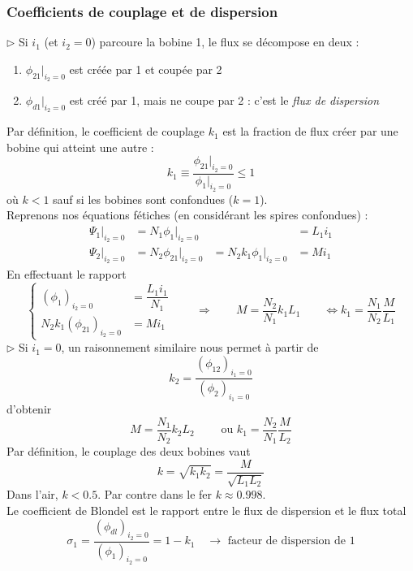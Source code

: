 		\subsubsection{Coefficients de couplage et de dispersion}
		$\triangleright$ Si $i_1$ (et $i_2=0$) parcoure la bobine 1, le flux se décompose en deux :
		\begin{enumerate}
		\item $\phi_{21}|_{i_2=0}$ est créée par 1 et coupée par 2
		\item $\phi_{d1}|_{i_2=0}$ est créé par 1, mais ne coupe par 2 : c'est le 
		\textit{flux de dispersion}
		\end{enumerate}
		Par définition, le coefficient de couplage $k_1$ est la fraction de flux 
		créer par une bobine qui atteint une autre :
		\begin{equation}
		k_1 \equiv \frac{\phi_{21}|_{i_2=0}}{\phi_1|_{i_2=0}}\leq 1
		\end{equation}
		où $k<1$ sauf si les bobines sont confondues ($k=1$).\\
		Reprenons nos équations fétiches (en considérant les spires confondues) :
		\begin{equation}
		\begin{array}{llll}
		\Psi_1|_{i_2=0} &= N_1\phi_1|_{i_2=0}& &= L_1i_1\\
		\Psi_2|_{i_2=0} &= N_2\phi_{21}|_{i_2=0}&= N_2k_1\phi_1|_{i_2=0} &= Mi_1		
		\end{array}
		\end{equation}
		En effectuant le rapport 
		\begin{equation}
		\left\{\begin{array}{ll}
		(\phi_1)_{i_2=0} &= \dfrac{L_1i_1}{N_1}\\
		N_2k_1(\phi_{21})_{i_2=0} &= Mi_1
		\end{array}\right.\qquad \Longrightarrow \qquad
		M = \frac{N_2}{N_1}k_1L_1\qquad \Leftrightarrow k_1 = \frac{N_1}{N_2}\frac{M}{L_1}
		\label{eq:3.23}
		\end{equation}
		$\triangleright$ Si $i_1=0$, un raisonnement similaire nous permet à partir de 
		\begin{equation}
		k_2 = \frac{(\phi_{12})_{i_1=0}}{(\phi_2)_{i_1=0}}
		\end{equation}
		d'obtenir 
		\begin{equation}
		M = \frac{N_1}{N_2}k_2L_2\qquad \text{ ou } k_1 = \frac{N_2}{N_1}\frac{M}{L_2}
		\end{equation}	
		Par définition, le couplage des deux bobines vaut
		\begin{equation}
		k = \sqrt{k_1k_2} = \frac{M}{\sqrt{L_1L_2}}
		\end{equation}
		Dans l'air, $k<0.5$. Par contre dans le fer $k \approx 0.998$.\\
		Le coefficient de Blondel est le rapport entre le flux de dispersion et le flux 
		total
		\begin{equation}
		\sigma_1 = \frac{(\phi_{dl})_{i_2=0}}{(\phi_1)_{i_2=0}} = 1-k_1\quad \rightarrow 
		\text{ facteur de dispersion de 1}
		\end{equation}
		
